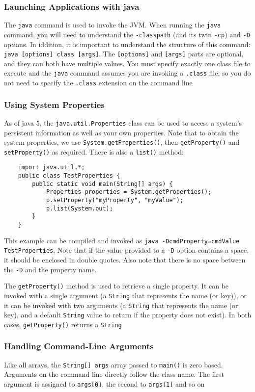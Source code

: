 \subsubsection{Launching Applications with java}
The \verb#java# command is used to invoke the JVM. When running the \verb#java# 
command, you will need to understand the \verb#-classpath# (and its twin 
\verb#-cp#) and \verb#-D# options. In iddition, it is important to understand 
the structure of this command: \verb#java [options] class [args]#. The 
\verb#[options]# and \verb#[args]# parts are optional, and they can both have 
multiple values. You must specify exactly one class file to execute and the 
\verb#java# command assumes you are invoking a \verb#.class# file, so you do 
not need to specify the \verb#.class# extension on the command line

\subsubsection{Using System Properties}
As of java 5, the \verb#java.util.Properties# class can be used to access a 
system's persistent information as well as your own properties. Note that to 
obtain the system properties, we use \verb#System.getProperties()#, then 
\verb#getProperty()# and \verb#setProperty()# as required. There is also a 
\verb#list()# method:
\begin{verbatim}
    import java.util.*;
    public class TestProperties {
        public static void main(String[] args) {
            Properties properties = System.getProperties();
            p.setProperty("myProperty", "myValue");
            p.list(System.out);
        }
    }
\end{verbatim}
This example can be compiled and invoked as \verb#java -DcmdProperty=cmdValue TestProperties#. Note that if the value provided to a \verb#-D# option contains 
a space, it should be enclosed in double quotes. Also note that there is no 
space between the \verb#-D# and the property name.

The \verb#getProperty()# method is used to retrieve a single property. It can 
be invoked with a single argument (a \verb#String# that represents the name (or 
key)), or it can be invoked with two arguments (a \verb#String# that represents 
the name (or key), and a default \verb#String# value to return if the property 
does not exist). In both cases, \verb#getProperty()# returns a \verb#String#

\subsubsection{Handling Command-Line Arguments}
Like all arrays, the \verb#String[] args# array passed to \verb#main()# is zero 
based. Arguments on the command line directly follow the class name. The first 
argument is assigned to \verb#args[0]#, the second to \verb#args[1]# and so on


